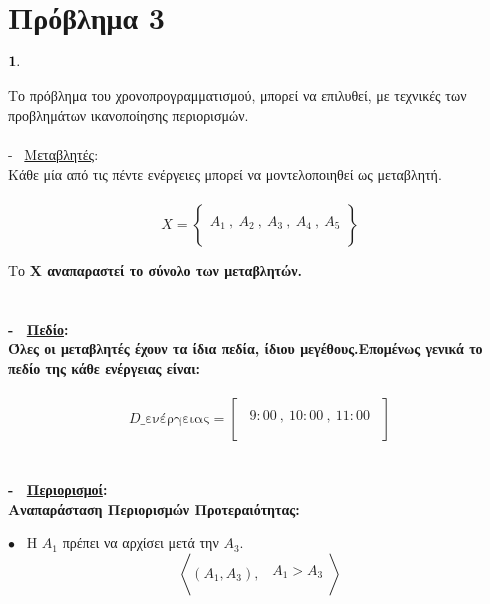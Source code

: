 \documentclass[10pt]{article}
\begin{document}
\section*{Πρόβλημα 3}
\vspace{5mm}

\hspace{5mm}$\bf 1. \normalfont$ \\ \\
Το πρόβλημα του χρονοπρογραμματισμού, μπορεί να επιλυθεί, με τεχνικές των προβλημάτων ικανοποίησης περιορισμών. \\ \\
- \  \underline{Μεταβλητές}:  \\

Κάθε μία από τις πέντε ενέργειες μπορεί να μοντελοποιηθεί ως μεταβλητή. 
\\ \\
\[  X =
\left\{ 
\begin{array}{ll}
\\
      A_{1} \ , \ A_{2} \ , \  A_{3} \ , \ A_{4} \ , \ A_{5}
     \\ \\
     \end{array} 
\right \} \]

Το \bf Χ \normalfont αναπαραστεί το σύνολο των μεταβλητών. \\ \\ \\
- \ \underline{Πεδίο}:  \\

Όλες οι μεταβλητές έχουν τα ίδια πεδία, ίδιου μεγέθους.Επομένως γενικά το πεδίο της κάθε ενέργειας είναι:\\ \\
\[  D\_\text{ενέργειας} =
\left [
\begin{array}{ll}
\\
\ \ 9: 00 \ , \ 10:00 \ , \ 11:00 \ \
     \\ \\
     \end{array} 
\right ] \] \\ \\
- \ \underline{Περιορισμοί}: \\

Αναπαράσταση Περιορισμών Προτεραιότητας:

\vspace{5mm}

\hspace{5mm}$\bullet$ \ Η $A_{1}$ πρέπει να αρχίσει μετά την $A_{3}$. \\
\[ 
\left<   (A_{1}, A_{3}) , 
\begin{array}{ll}
\\  \ \ A_{1} > A_{3}\\ \\
     
     \end{array} 
\right > \] 
\\ 
\end{document}
